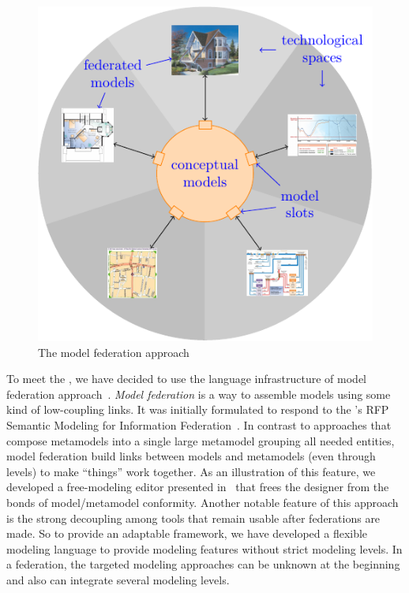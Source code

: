 

\begin{figure}[t]
    \centering
    \includegraphics[width=\columnwidth]{Figures/federation.pdf}
    \caption{The model federation approach}
    \label{fig:mf}
\end{figure}

To meet the \mlpc, we have decided to use the language infrastructure of
model federation approach~\parencite{Golra2016-federation}. \emph{Model
  federation} is a way to assemble models using some kind of
low-coupling links. It was initially  formulated to respond to the \OMG's RFP
Semantic Modeling for Information Federation~\parencite{simf}. In
contrast to approaches that compose metamodels into a single large
metamodel grouping all needed entities, model federation build links
between models and metamodels (even through levels) to make ``things''
work together. As an illustration of this feature, we developed a
free-modeling editor presented
in~\parencite{models2016-freemodel} that frees the designer from the bonds of
model/metamodel conformity. Another notable feature of
this approach is the strong decoupling among tools that remain usable
after federations are made.
So to provide an adaptable framework, we have developed a flexible modeling language to provide modeling features without strict modeling levels. In a federation, the targeted modeling approaches can be unknown at the beginning and also can integrate several modeling levels.


